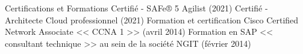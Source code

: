 \begin{rubric}{Certifications et Formations}
%
%
\entry*[]    Certifié - SAFe® 5 Agilist (2021)
\entry*[]    Certifié - Architecte Cloud professionnel (2021)
\entry*[]	 Formation et certification Cisco Certified Network Associate << CCNA 1 >> (avril 2014) %
\entry*[]	 Formation en SAP << consultant technique >> au sein de la société NGIT (février 2014) %
\end{rubric}

